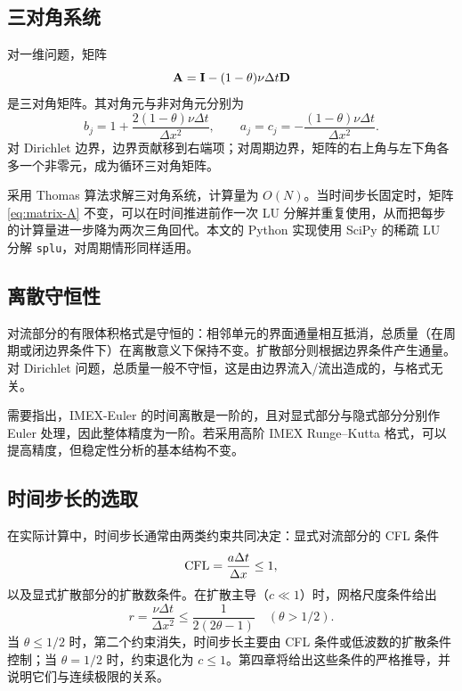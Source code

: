 \subsection{三对角系统}

对一维问题，矩阵
\begin{equation}
  {\mathbf{A}}={\mathbf{I}}-(1-\theta)\nu\Delta t{\mathbf{D}}
  \label{eq:matrix-A}
\end{equation}
是三对角矩阵。其对角元与非对角元分别为
\begin{equation}
  b_j=1+\frac{2(1-\theta)\nu\Delta t}{\Delta x^2},\qquad
  a_j=c_j=-\frac{(1-\theta)\nu\Delta t}{\Delta x^2}.
  \label{eq:tridiag-coeffs}
\end{equation}
对 Dirichlet 边界，边界贡献移到右端项；对周期边界，矩阵的右上角与左下角各多一个非零元，成为循环三对角矩阵。

采用 Thomas 算法求解三对角系统，计算量为 $O(N)$。当时间步长固定时，矩阵 \eqref{eq:matrix-A} 不变，可以在时间推进前作一次 LU 分解并重复使用，从而把每步的计算量进一步降为两次三角回代。本文的 Python 实现使用 SciPy 的稀疏 LU 分解 \texttt{splu}，对周期情形同样适用。

\subsection{离散守恒性}

对流部分的有限体积格式是守恒的：相邻单元的界面通量相互抵消，总质量（在周期或闭边界条件下）在离散意义下保持不变。扩散部分则根据边界条件产生通量。对 Dirichlet 问题，总质量一般不守恒，这是由边界流入/流出造成的，与格式无关。

需要指出，IMEX-Euler 的时间离散是一阶的，且对显式部分与隐式部分分别作 Euler 处理，因此整体精度为一阶。若采用高阶 IMEX Runge--Kutta 格式，可以提高精度，但稳定性分析的基本结构不变。

\subsection{时间步长的选取}

在实际计算中，时间步长通常由两类约束共同决定：显式对流部分的 CFL 条件
\begin{equation}
  \mathrm{CFL}=\frac{a\Delta t}{\Delta x}\le1,
  \label{eq:cfl}
\end{equation}
以及显式扩散部分的扩散数条件。在扩散主导（$c\ll1$）时，网格尺度条件给出
\begin{equation}
  r=\frac{\nu\Delta t}{\Delta x^2}\le\frac{1}{2(2\theta-1)}\quad(\theta>1/2).
  \label{eq:diffusion-number}
\end{equation}
当 $\theta\le1/2$ 时，第二个约束消失，时间步长主要由 CFL 条件或低波数的扩散条件控制；当 $\theta=1/2$ 时，约束退化为 $c\le1$。第四章将给出这些条件的严格推导，并说明它们与连续极限的关系。

